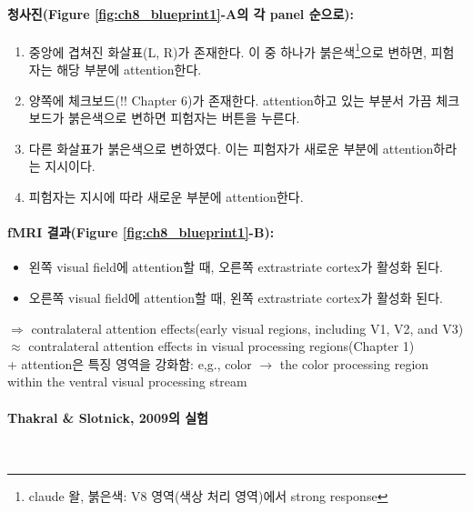 \documentclass[../note.tex]{subfiles}
\begin{document}
{  \paragraph{청사진(Figure \ref{fig:ch8_blueprint1}-A의 각 panel 순으로):}
  \begin{enumerate}
    \item
      중앙에 겹쳐진 화살표(L, R)가 존재한다. 이 중 하나가 붉은색\footnote{claude 왈, 붉은색: V8 영역(색상 처리 영역)에서 strong response}으로 변하면, 피험자는 해당 부분에 attention한다.
    \item
      양쪽에 체크보드(!! Chapter 6)가 존재한다. attention하고 있는 부분서 가끔 체크보드가 붉은색으로 변하면 피험자는 버튼을 누른다.
    \item
      다른 화살표가 붉은색으로 변하였다. 이는 피험자가 새로운 부분에 attention하라는 지시이다.
    \item
      피험자는 지시에 따라 새로운 부분에 attention한다.
  \end{enumerate}

  \paragraph{fMRI 결과(Figure \ref{fig:ch8_blueprint1}-B):}
  \begin{itemize}
    \item
      왼쪽 visual field에 attention할 때, 오른쪽 extrastriate cortex가 활성화 된다.
    \item
      오른쪽 visual field에 attention할 때, 왼쪽 extrastriate cortex가 활성화 된다.
  \end{itemize}
  $\Longrightarrow$ contralateral attention effects(early visual regions, including V1, V2, and V3) 
  $\approx$ contralateral attention effects in visual processing regions(Chapter 1)\\

  + attention은 특징 영역을 강화함: e,g., color $\longrightarrow$ the color processing region within the ventral visual processing stream

  \paragraph{Thakral & Slotnick, 2009의 실험}\\

}
\end{document}
